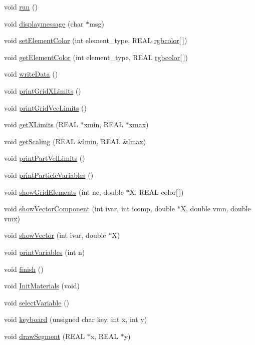 \begin{CompactItemize}
void \hyperlink{namespaceGui_225eb7edaace31eb6cc4ec3173b2a703}{run} ()
\item 
void \hyperlink{namespaceGui_3a5bf26c85086313b175ec4901ac04bd}{displaymessage} (char $\ast$msg)
\item 
void \hyperlink{namespaceGui_7ff1dbc60509be2005c1732738066a69}{setElementColor} (int element\_\-type, REAL \hyperlink{namespaceGui_e32ed5f0f6c168d88ee4dcfcb237aa7a}{rgbcolor}\mbox{[}$\,$\mbox{]})
\item 
void \hyperlink{namespaceGui_b4972a7318cbe5e96312527816694e1e}{getElementColor} (int element\_\-type, REAL \hyperlink{namespaceGui_e32ed5f0f6c168d88ee4dcfcb237aa7a}{rgbcolor}\mbox{[}$\,$\mbox{]})
\item 
void \hyperlink{namespaceGui_84221f62186ae4133398e1b6a2475d09}{writeData} ()
\item 
void \hyperlink{namespaceGui_193a20479572ecdce2ba9826ea1afa52}{printGridXLimits} ()
\item 
void \hyperlink{namespaceGui_1bcce63e80eb6c25379b1902623ae885}{printGridVecLimits} ()
\item 
void \hyperlink{namespaceGui_6303d84a2defe353bcdde5e2d64c54fc}{getXLimits} (REAL $\ast$\hyperlink{namespaceGui_0dfb5583ee08d6cf807efcd9813cf4c5}{xmin}, REAL $\ast$\hyperlink{namespaceGui_93f1d37d2bd27e638d68895f5d264cbc}{xmax})
\item 
void \hyperlink{namespaceGui_ecc4bc7e909d123787c57982a5059d37}{getScaling} (REAL \&\hyperlink{namespaceGui_56c94fbda09f27d64aa2e60813b5c72f}{lmin}, REAL \&\hyperlink{namespaceGui_ac727ddae788cc92ec47a42a42c624c1}{lmax})
\item 
void \hyperlink{namespaceGui_a532192f836051be770c02dfd5b54379}{printPartVelLimits} ()
\item 
void \hyperlink{namespaceGui_b12854bedf083987e0815e02f599ec45}{printParticleVariables} ()
\item 
void \hyperlink{namespaceGui_8e3c2fd257a10f8ebcb0bb5ca80960cf}{showGridElements} (int ne, double $\ast$X, REAL color\mbox{[}$\,$\mbox{]})
\item 
void \hyperlink{namespaceGui_fc1dab157022a5a7a7570d5e14c7111d}{showVectorComponent} (int ivar, int icomp, double $\ast$X, double vmn, double vmx)
\item 
void \hyperlink{namespaceGui_b2f8045a7d03276f092d05afd5be1e71}{showVector} (int ivar, double $\ast$X)
\item 
void \hyperlink{namespaceGui_02455eabb69d94328ba20a3d8abd5239}{printVariables} (int n)
\item 
void \hyperlink{namespaceGui_0a78be634dd9a0fd330799e5d6a2bada}{finish} ()
\item 
void \hyperlink{namespaceGui_6b37f7051aba2059c1b5b91694708408}{InitMaterials} (void)
\item 
void \hyperlink{namespaceGui_dd6f6cfa5773cf46c29030ef50a87a06}{selectVariable} ()
\item 
void \hyperlink{namespaceGui_65935dbee960e580e4aa401013022f14}{keyboard} (unsigned char key, int x, int y)
\item 
void \hyperlink{namespaceGui_f509da960f39882c423601210a118a96}{drawSegment} (REAL $\ast$x, REAL $\ast$y)
\end{CompactItemize}
